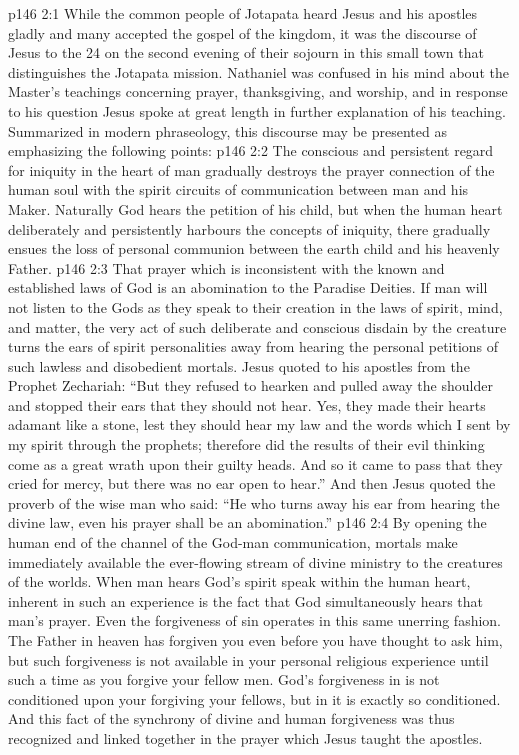 \vs p146 2:1 While the common people of Jotapata heard Jesus and his apostles gladly and many accepted the gospel of the kingdom, it was the discourse of Jesus to the 24 on the second evening of their sojourn in this small town that distinguishes the Jotapata mission. Nathaniel was confused in his mind about the Master’s teachings concerning prayer, thanksgiving, and worship, and in response to his question Jesus spoke at great length in further explanation of his teaching. Summarized in modern phraseology, this discourse may be presented as emphasizing the following points:
\vs p146 2:2 \bibnobreakspace The conscious and persistent regard for iniquity in the heart of man gradually destroys the prayer connection of the human soul with the spirit circuits of communication between man and his Maker. Naturally God hears the petition of his child, but when the human heart deliberately and persistently harbours the concepts of iniquity, there gradually ensues the loss of personal communion between the earth child and his heavenly Father.
\vs p146 2:3 \bibnobreakspace That prayer which is inconsistent with the known and established laws of God is an abomination to the Paradise Deities. If man will not listen to the Gods as they speak to their creation in the laws of spirit, mind, and matter, the very act of such deliberate and conscious disdain by the creature turns the ears of spirit personalities away from hearing the personal petitions of such lawless and disobedient mortals. Jesus quoted to his apostles from the Prophet Zechariah: “But they refused to hearken and pulled away the shoulder and stopped their ears that they should not hear. Yes, they made their hearts adamant like a stone, lest they should hear my law and the words which I sent by my spirit through the prophets; therefore did the results of their evil thinking come as a great wrath upon their guilty heads. And so it came to pass that they cried for mercy, but there was no ear open to hear.” And then Jesus quoted the proverb of the wise man who said: “He who turns away his ear from hearing the divine law, even his prayer shall be an abomination.”
\vs p146 2:4 \bibnobreakspace By opening the human end of the channel of the God\hyp{}man communication, mortals make immediately available the ever\hyp{}flowing stream of divine ministry to the creatures of the worlds. When man hears God’s spirit speak within the human heart, inherent in such an experience is the fact that God simultaneously hears that man’s prayer. Even the forgiveness of sin operates in this same unerring fashion. The Father in heaven has forgiven you even before you have thought to ask him, but such forgiveness is not available in your personal religious experience until such a time as you forgive your fellow men. God’s forgiveness in  is not conditioned upon your forgiving your fellows, but in  it is exactly so conditioned. And this fact of the synchrony of divine and human forgiveness was thus recognized and linked together in the prayer which Jesus taught the apostles.
